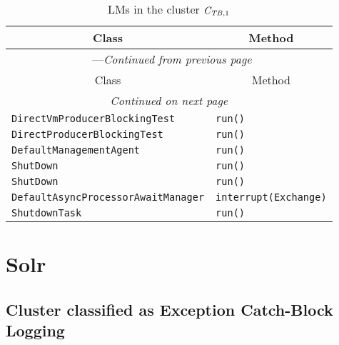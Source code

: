 \begin{center}
\begin{longtable}{ll}
\caption{LMs in the cluster $\mathit{C}_{\mathit{TB},1}$}\\
\toprule\multicolumn{1}{c}{Class}&\multicolumn{1}{c}{Method}\\\midrule
\endfirsthead

\multicolumn{2}{c}{\tablename\ \thetable{}---\textit{Continued from previous page}} \\\midrule
\multicolumn{1}{c}{Class}&\multicolumn{1}{c}{Method}\\\midrule
\endhead
\multicolumn{2}{c}{\textit{Continued on next page}}\\\midrule
\endfoot
\bottomrule
\endlastfoot

\lstinline/DirectVmProducerBlockingTest/&{\lstinline/run()/}\\
\lstinline/DirectProducerBlockingTest/&{\lstinline/run()/}\\
\lstinline/DefaultManagementAgent/&{\lstinline/run()/}\\
\lstinline/ShutDown/&{\lstinline/run()/}\\
\lstinline/ShutDown/&{\lstinline/run()/}\\
\lstinline/DefaultAsyncProcessorAwaitManager/&{\lstinline/interrupt(Exchange)/}\\
\lstinline/ShutdownTask/&{\lstinline/run()/}\\
\end{longtable}
\end{center}

\section{Solr}\label{solr}

\subsection{Cluster classified as Exception Catch-Block Logging}

